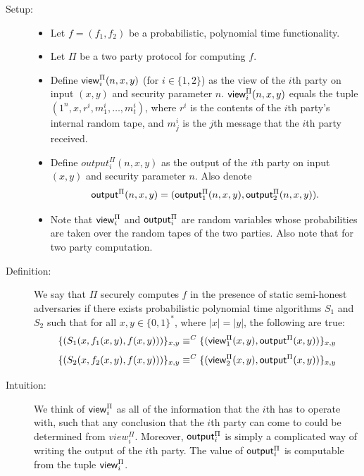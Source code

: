 \documentclass[12pt,twoside]{reedthesis}
\newcommand{\outputrv}{{\sf output}}
\newcommand{\viewrv}{{\sf view}}
\begin{document}
\begin{description}
\item [Setup:] \hfill
    \begin{itemize}
        \item Let $f = (f_1, f_2)$ be a probabilistic, polynomial time functionality. 

        \item Let $\Pi$ be a two party protocol for computing $f$. 

        \item Define $\viewrv_i^{\Pi}(n,x,y)$ (for $i \in \{1,2\}$) as the view of the $i$th party on input $(x,y)$ and security parameter $n$.
        $\viewrv_i^{\Pi}(n,x,y)$ equals the tuple $(1^n, x, r^i, m_1^i, \ldots, m_t^i)$, where $r^i$ is the contents of the $i$th party's internal random tape, and $m_j^i$ is the $j$th message that the $i$th party received.
    
        \item Define $output^{\Pi}_i(n,x,y)$ as the output of the $i$th party on input $(x,y)$ and security parameter $n$.
        Also denote
        $$ \outputrv^{\Pi}(n,x,y) = (\outputrv^{\Pi}_1(n,x,y), \outputrv^{\Pi}_2(n,x,y)).$$

    \item Note that $\viewrv^{\Pi}_i$ and $\outputrv^{\Pi}_i$ are random variables whose probabilities are taken over the random tapes of the two parties. Also note that for two party computation.
\end{itemize}
\item [Definition:]
We say that $\Pi$ securely computes $f$ in the presence of static semi-honest adversaries if there exists probabilistic polynomial time algorithms $S_1$ and $S_2$ such that for all $x,y \in \{0,1\}^*$, where $|x| = |y|$, the following are true:
\begin{equation} 
    \label{eqn:secdef1}
    \{(S_1(x, f_1(x,y), f(x,y)))\}_{x,y} \equiv^C \{(\viewrv^{\Pi}_1(x,y), \outputrv^{\Pi}(x,y)) \}_{x,y} 
\end{equation}
\begin{equation} 
    \label{eqn:secdef2}
    \{(S_2(x, f_2(x,y), f(x,y)))\}_{x,y} \equiv^C \{(\viewrv^{\Pi}_2(x,y), \outputrv^{\Pi}(x,y)) \}_{x,y} 
\end{equation}

\item[Intuition:]
    We think of $\viewrv^{\Pi}_i$ as all of the information that the $i$th has to operate with, such that any conclusion that the $i$th party can come to could be determined from $view^{\Pi}_i$.
    Moreover, $\outputrv^{\Pi}_i$ is simply a complicated way of writing the output of the $i$th party. 
    The value of $\outputrv^{\Pi}_i$ is computable from the tuple $\viewrv^{\Pi}_i$.


\end{description}
\end{document}
